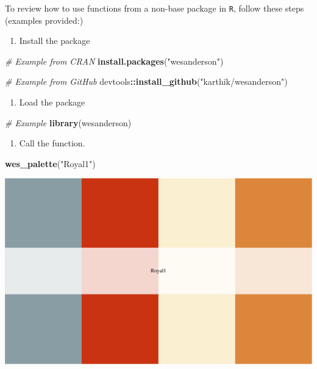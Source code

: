 \documentclass[
]{book}
\newenvironment{Shaded}{\begin{snugshade}}{\end{snugshade}}
\newcommand{\CommentTok}[1]{\textcolor[rgb]{0.56,0.35,0.01}{\textit{#1}}}
\newcommand{\KeywordTok}[1]{\textcolor[rgb]{0.13,0.29,0.53}{\textbf{#1}}}
\newcommand{\NormalTok}[1]{#1}
\newcommand{\OperatorTok}[1]{\textcolor[rgb]{0.81,0.36,0.00}{\textbf{#1}}}
\newcommand{\StringTok}[1]{\textcolor[rgb]{0.31,0.60,0.02}{#1}}
\providecommand{\tightlist}{%
  \setlength{\itemsep}{0pt}\setlength{\parskip}{0pt}}
\begin{document}
To review how to use functions from a non-base package in \texttt{R}, follow these steps (examples provided:)

\begin{enumerate}
\def\labelenumi{\arabic{enumi}.}
\tightlist
\item
  Install the package
\end{enumerate}

\begin{Shaded}
\begin{Highlighting}[]
\CommentTok{# Example from CRAN}
\KeywordTok{install.packages}\NormalTok{(}\StringTok{"wesanderson"}\NormalTok{)}

\CommentTok{# Example from GitHub}
\NormalTok{devtools}\OperatorTok{::}\KeywordTok{install_github}\NormalTok{(}\StringTok{"karthik/wesanderson"}\NormalTok{)}
\end{Highlighting}
\end{Shaded}

\begin{enumerate}
\def\labelenumi{\arabic{enumi}.}
\setcounter{enumi}{1}
\tightlist
\item
  Load the package
\end{enumerate}

\begin{Shaded}
\begin{Highlighting}[]
\CommentTok{# Example}
\KeywordTok{library}\NormalTok{(wesanderson)}
\end{Highlighting}
\end{Shaded}

\begin{enumerate}
\def\labelenumi{\arabic{enumi}.}
\setcounter{enumi}{2}
\tightlist
\item
  Call the function.
\end{enumerate}

\begin{Shaded}
\begin{Highlighting}[]
\KeywordTok{wes_palette}\NormalTok{(}\StringTok{"Royal1"}\NormalTok{)}
\end{Highlighting}
\end{Shaded}

\includegraphics{figures/unnamed-chunk-132-1.pdf}
\end{document}
